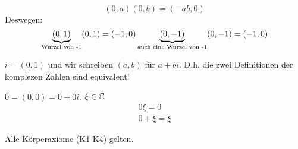 \begin{Bem}
  \begin{equation*}
    (0,a)(0,b)=(-ab, 0)
  \end{equation*}
  Deswegen:
  \begin{equation*}
    \underbrace{(0,1)}_{\text{Wurzel von -1}}(0,1)=(-1,0)\\
    \underbrace{(0,-1)}_{\text{auch eine Wurzel von -1}}(0,-1)=(-1,0)
  \end{equation*}
\end{Bem}
\begin{Bem}
  $i=(0,1)$ und wir schreiben $(a,b)$ für $a+bi$. D.h. die zwei Definitionen der
komplezen Zahlen sind equivalent!
\end{Bem}
\begin{Bem}
  $0=(0,0)=0+0i$. $\xi\in\mathbb{C}$
  \begin{align*}
    0\xi=0\\
    0+\xi=\xi
  \end{align*}
\end{Bem}
\begin{Sat}\label{s:CK}
  Alle Körperaxiome (K1-K4) gelten.
\end{Sat}

